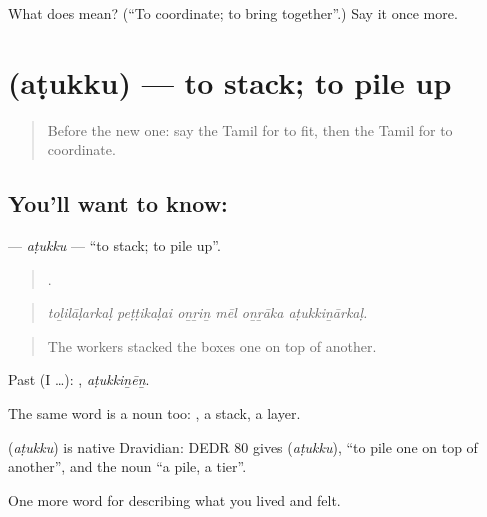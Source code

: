 \begin{tcolorbox}[breakable,colback=teal!4,colframe=teal!35!black,title={Before you move on}]
What does  mean? (\textquotedblleft{}To coordinate; to bring together\textquotedblright{}.) Say it once more.
\end{tcolorbox}
\section[\texorpdfstring{\ta{அடுக்கு} (aṭukku)}{அடுக்கு (aṭukku)}]{ (aṭukku) — to stack; to pile up}

\label{lesson:TA-C510-atukku}



\begin{quote}
Before the new one: say the Tamil for to fit, then the Tamil for to coordinate.
\end{quote}

\subsection*{You'll want to know: }
\textbf{} — \emph{aṭukku} — \textquotedblleft{}to stack; to pile up\textquotedblright{}.

\begin{quote}
     .
\end{quote}

\begin{quote}
\emph{toḻilāḷarkaḷ peṭṭikaḷai oṉṟiṉ mēl oṉṟāka aṭukkiṉārkaḷ.}
\end{quote}

\begin{quote}
The workers stacked the boxes one on top of another.
\end{quote}

Past (I …): , \emph{aṭukkiṉēṉ}.

The same word is a noun too:  , a stack, a layer.

\begin{cousinweb}
\textbf{} (\emph{aṭukku}) is native Dravidian: DEDR 80 gives  (\emph{aṭukku}), \textquotedblleft{}to pile one on top of another\textquotedblright{}, and the noun \textquotedblleft{}a pile, a tier\textquotedblright{}.
\end{cousinweb}

\begin{grammarlens}[title={What you've built}]
One more word for describing what you lived and felt.
\end{grammarlens}

